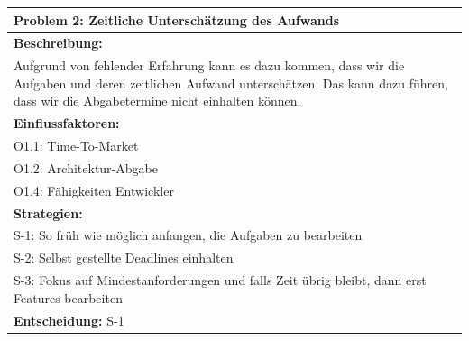 \documentclass[fontsize=12pt,paper=a4,twoside]{scrartcl}
\begin{document}
\begin{longtable}{|p{15cm}|}
\hline
Problem 2: Zeitliche Unterschätzung des Aufwands                                                                           
\\ \hline                                                                                                                                                                                                                                                                                                                                                                                                                                                                                                                                                        
\textbf{Beschreibung:} \\
Aufgrund von fehlender Erfahrung kann es dazu kommen, dass wir die Aufgaben und deren zeitlichen Aufwand unterschätzen.
Das kann dazu führen, dass wir die Abgabetermine nicht einhalten können.
\\ \hline
\textbf{Einflussfaktoren:} \\
O1.1: Time-To-Market \\
O1.2: Architektur-Abgabe \\
O1.4: Fähigkeiten Entwickler
\\ \hline
\textbf{Strategien:} \\
S-1: So früh wie möglich anfangen, die Aufgaben zu bearbeiten \\
S-2: Selbst gestellte Deadlines einhalten \\
S-3: Fokus auf Mindestanforderungen und falls Zeit übrig bleibt, dann erst Features bearbeiten
 \\ \hline
 \textbf{Entscheidung:} S-1
\\ \hline
\end{longtable}
\newpage
\end{document}

